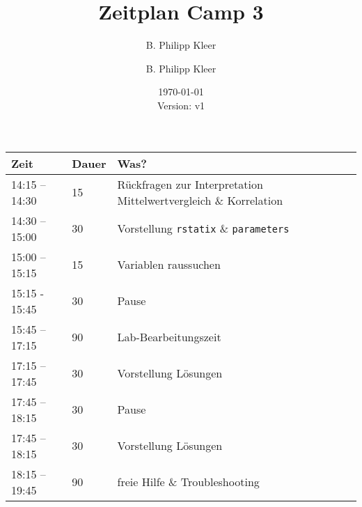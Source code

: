 \documentclass[11pt,a4paper]{article}
\author{B. Philipp Kleer}
\title{%
  Zeitplan Camp 3 \\
  }
\author{B. Philipp Kleer}
\date{\today \\ \small{Version: v1}}
\begin{document}
\maketitle

\center
\begin{longtable}{p{} p{} p{}}
	\toprule[2pt]
	\textbf{Zeit} & \textbf{Dauer} & \textbf{Was?}\\
	\midrule
	14:15 – 14:30 & 15 & Rückfragen zur Interpretation Mittelwertvergleich \& Korrelation\\
	\midrule
	14:30 – 15:00 & 30 & Vorstellung \texttt{rstatix} \& \texttt{parameters}\\
	\midrule
	15:00 – 15:15 & 15 & Variablen raussuchen\\
	\midrule[2pt]
	15:15 - 15:45 & 30 & Pause \\
	\midrule[2pt]
	15:45 – 17:15 & 90 & Lab-Bearbeitungszeit\\
	\midrule
	17:15 – 17:45 & 30 & Vorstellung Lösungen\\
	\midrule[2pt]
	17:45 – 18:15 & 30 & Pause\\
	\midrule[2pt]
	17:45 – 18:15 & 30 & Vorstellung Lösungen\\
	\midrule
	18:15 – 19:45 & 90 & freie Hilfe \& Troubleshooting\\	
	\bottomrule[2pt]
\end{longtable}
\end{document}
